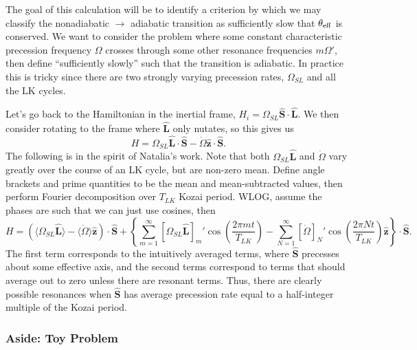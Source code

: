 \documentclass[11pt,
        usenames, %
        dvipsnames %
    ]{article}
\newcommand*{\bm}[1]{\boldsymbol{\mathbf{#1}}}
\newcommand*{\uv}[1]{\hat{\bm{#1}}}
\newcommand*{\ev}[1]{\langle#1\rangle}
\newcommand*{\p}[1]{\left(#1\right)}
\newcommand*{\s}[1]{\left[#1\right]}
\newcommand*{\z}[1]{\left\{#1\right\}}
\begin{document}
The goal of this calculation will be to identify a criterion by which we may
classify the nonadiabatic $\to$ adiabatic transition as sufficiently slow that
$\theta_{\rm eff}$ is conserved. We want to consider the problem where some
constant characteristic precession frequency $\Omega$ crosses through some other
resonance frequencies $m\Omega'$, then define ``sufficiently slowly'' such that
the transition is adiabatic. In practice this is tricky since there are two
strongly varying precession rates, $\Omega_{SL}$ and all the LK cycles.

Let's go back to the Hamiltonian in the inertial frame, $H_i =
\Omega_{SL}\uv{S} \cdot \uv{L}$. We then consider rotating to the frame where
$\uv{L}$ only nutates, so this gives us
\begin{equation}
    H = \Omega_{SL}\uv{L} \cdot \uv{S} - \dot{\Omega} \uv{z} \cdot \uv{S}.
\end{equation}
The following is in the spirit of Natalia's work. Note that both
$\Omega_{SL}\uv{L}$ and $\dot{\Omega}$ vary greatly over the course of an LK
cycle, but are non-zero mean. Define angle brackets and prime quantities to be
the mean and mean-subtracted values, then perform Fourier decomposition over
$T_{LK}$ Kozai period. WLOG, assume the phases are such that we can just use
cosines, then
\begin{equation}
    H = \p{\ev{\Omega_{SL}\uv{L}} - \ev{\dot{\Omega}} \uv{z}}
        \cdot \uv{S}
        + \z{\sum\limits_{m = 1}^\infty \s{\Omega_{SL}\uv{L}}_m'
                \cos \p{\frac{2\pi mt}{T_{LK}}}
            - \sum\limits_{N = 1}^\infty \s{\dot{\Omega}}_N'
                \cos \p{\frac{2\pi Nt}{T_{LK}}}
            \uv{z}} \cdot \uv{S}.
\end{equation}
The first term corresponds to the intuitively averaged terms, where $\uv{S}$
precesses about some effective axis, and the second terms correspond to
terms that should average out to zero unless there are resonant terms. Thus,
there are clearly possible resonances when $\uv{S}$ has average precession rate
equal to a half-integer multiple of the Kozai period.

\subsubsection{Aside: Toy Problem}
\end{document}
